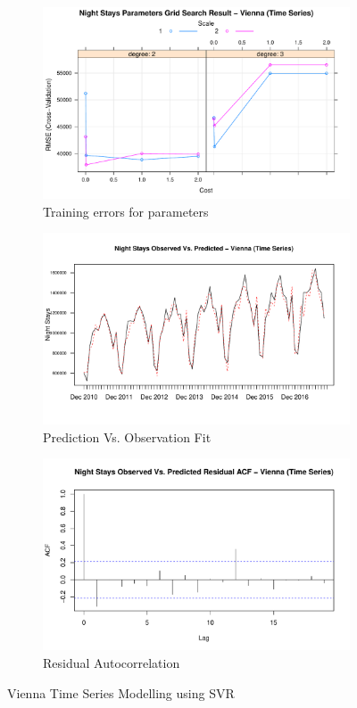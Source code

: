 \documentclass[a4paper,reqno,]{article}
\begin{document}
\begin{figure}[h!]
  \centering
  \begin{subfigure}[b]{0.32\linewidth}
    \includegraphics[width=\linewidth]{images/SVR/ViennaGrid.pdf}
    \caption{Training errors for parameters}
  \end{subfigure}
  \begin{subfigure}[b]{0.32\linewidth}
    \includegraphics[width=\linewidth]{images/SVR/ViennaTimeSeries.pdf}
    \caption{Prediction Vs. Observation Fit}
  \end{subfigure}
  \begin{subfigure}[b]{0.32\linewidth}
    \includegraphics[width=\linewidth]{images/SVR/ViennaACF.pdf}
    \caption{Residual Autocorrelation}
  \end{subfigure}
  \caption{Vienna Time Series Modelling using SVR}
  \label{fig:Time Series}
\end{figure}
\end{document}
